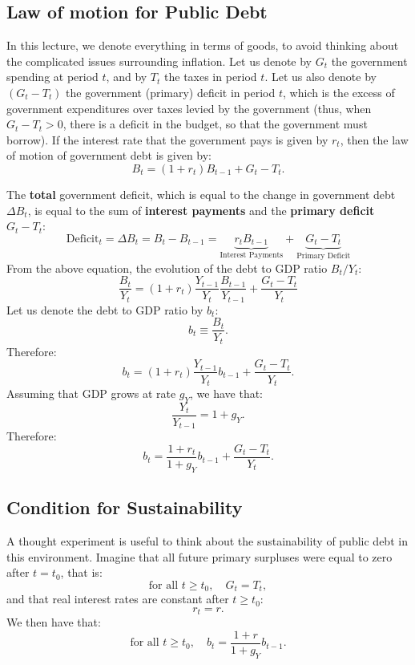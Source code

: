 \documentclass[]{book}
\theoremstyle{definition}
\theoremstyle{definition}
\theoremstyle{definition}
\theoremstyle{remark}
\begin{document}
\subsection{Law of motion for Public
Debt}\label{law-of-motion-for-public-debt}

In this lecture, we denote everything in terms of goods, to avoid
thinking about the complicated issues surrounding inflation. Let us
denote by \(G_t\) the government spending at period \(t\), and by
\(T_t\) the taxes in period \(t\). Let us also denote by \((G_t-T_t)\)
the government (primary) deficit in period \(t\), which is the excess of
government expenditures over taxes levied by the government (thus, when
\(G_t-T_t>0\), there is a deficit in the budget, so that the government
must borrow). If the interest rate that the government pays is given by
\(r_t\), then the law of motion of government debt is given by:
\[B_{t}=(1+r_t)B_{t-1}+G_{t}-T_{t}.\]

The \textbf{total} government deficit, which is equal to the change in
government debt \(\Delta B_{t}\), is equal to the sum of
\textbf{interest payments} and the \textbf{primary deficit}
\(G_{t}-T_{t}:\)
\[\text{Deficit}_{t}=\Delta B_{t}=B_{t}-B_{t-1}=\underbrace{r_tB_{t-1}}_{\text{Interest Payments}}+\underbrace{G_{t}-T_{t}}_{\text{Primary Deficit}}\]
From the above equation, the evolution of the debt to GDP ratio
\(B_{t}/Y_{t}\):
\[\frac{B_{t}}{Y_{t}}=(1+r_t)\frac{Y_{t-1}}{Y_{t}}\frac{B_{t-1}}{Y_{t-1}}+\frac{G_{t}-T_{t}}{Y_{t}}\]
Let us denote the debt to GDP ratio by \(b_t\):
\[b_t \equiv \frac{B_t}{Y_t}.\] Therefore:
\[b_t = (1+r_t)\frac{Y_{t-1}}{Y_{t}}b_{t-1}+\frac{G_{t}-T_{t}}{Y_{t}}.\]
Assuming that GDP grows at rate \(g_Y\), we have that:
\[\frac{Y_t}{Y_{t-1}}=1+g_Y.\] Therefore:
\[\boxed{b_t = \frac{1+r_t}{1+g_Y}b_{t-1}+\frac{G_{t}-T_{t}}{Y_{t}}}.\]

\subsection{Condition for
Sustainability}\label{condition-for-sustainability}

A thought experiment is useful to think about the sustainability of
public debt in this environment. Imagine that all future primary
surpluses were equal to zero after \(t=t_0\), that is:
\[\text{for all }t\geq t_{0},\quad G_{t}=T_{t},\] and that real interest
rates are constant after \(t \geq t_0\): \[r_t=r.\] We then have that:
\[\text{for all }t\geq t_{0},\quad b_t = \frac{1+r}{1+g_Y}b_{t-1}.\]
\end{document}

